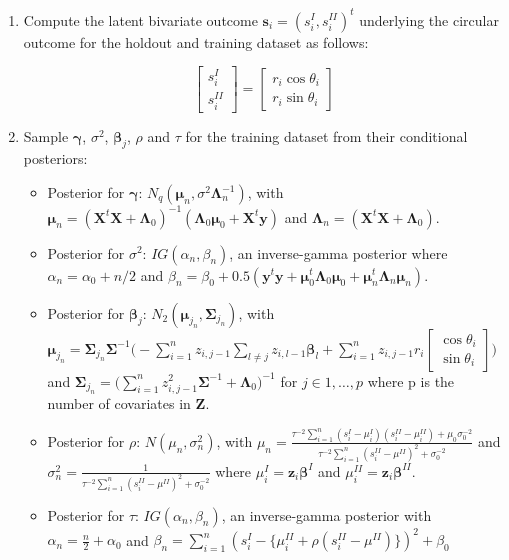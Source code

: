 \documentclass[11pt,]{article}
\begin{document}
\begin{appendices}
\begin{enumerate}
\item Compute the latent bivariate outcome $\boldsymbol{s}_i = (s_i^{I}, s_i^{II})^t$ underlying the circular outcome for the holdout and training dataset as follows:

$$\begin{bmatrix} s^{I}_{i} \\ s^{II}_{i} \end{bmatrix} = \begin{bmatrix} r_i \cos \theta_i \\  r_i\sin \theta_i\end{bmatrix}$$

\item Sample $\boldsymbol{\gamma}$, $\sigma^2$, $\boldsymbol{\beta}_j$, $\rho$ and $\tau$ for the training dataset from their conditional posteriors:

\begin{itemize}
\item Posterior for $\boldsymbol{\gamma}$: $N_q(\boldsymbol{\mu}_n, \sigma^2\boldsymbol{\Lambda}^{-1}_n)$, with $\boldsymbol{\mu}_n = (\boldsymbol{X}^t\boldsymbol{X} + \boldsymbol{\Lambda}_0)^{-1}(\boldsymbol{\Lambda}_0\boldsymbol{\mu}_0 + \boldsymbol{X}^t\boldsymbol{y})$ and $\boldsymbol{\Lambda}_n = (\boldsymbol{X}^t\boldsymbol{X} + \boldsymbol{\Lambda}_0)$.
\item Posterior for $\sigma^2$: $IG(\alpha_{n}, \beta_{n})$, an inverse-gamma posterior where $\alpha_{n} = \alpha_0 + n/2$ and $\beta_{n} = \beta_0 + 0.5(\boldsymbol{y}^t\boldsymbol{y} + \boldsymbol{\mu}_{0}^t\boldsymbol{\Lambda}_0\boldsymbol{\mu}_{0} + \boldsymbol{\mu}_{n}^t\boldsymbol{\Lambda}_n\boldsymbol{\mu}_{n})$.
\item Posterior for $\boldsymbol{\beta}_j$: $N_2(\boldsymbol{\mu}_{j_{n}}, \boldsymbol{\Sigma}_{j_{n}})$, with $\boldsymbol{\mu}_{j_{n}} = \boldsymbol{\Sigma}_{j_{n}}\boldsymbol{\Sigma}^{-1}\Bigg(-\sum_{i=1}^{n}z_{i,j-1}\sum_{l\neq j}z_{i,l-1}\boldsymbol{\beta}_l + \sum_{i=1}^{n}z_{i,j-1}r_i\begin{bmatrix} \cos \theta_i \\ \sin \theta_i\end{bmatrix}\Bigg)$ and  $\boldsymbol{\Sigma}_{j_{n}} = \Big(\sum_{i=1}^{n}z_{i,j-1}^2\boldsymbol{\Sigma}^{-1}+\boldsymbol{\Lambda}_0\Big)^{-1}$ for $j \in 1, \dots, p$ where p is the number of covariates in $\boldsymbol{Z}$.
\item Posterior for $\rho$: $N(\mu_n, \sigma^2_n)$, with $\mu_n = \frac{\tau^{-2} \sum_{i=1}^{n}(s^{I}_{i} - \mu_i^{I})(s^{II}_{i} - \mu_i^{II}) + \mu_0\sigma_0^{-2}}{\tau^{-2}\sum_{i=1}^{n}(s^{II}_{i} - \mu^{II})^2 + \sigma_0^{-2}}$ and $\sigma_n^2 = \frac{1}{\tau^{-2}\sum_{i=1}^{n}(s^{II}_{i} - \mu^{II})^2 + \sigma_0^{-2}}$ where $\mu_i^{I} = \boldsymbol{z}_i\boldsymbol{\beta}^{I}$ and $\mu_i^{II} = \boldsymbol{z}_i\boldsymbol{\beta}^{II}$.
\item Posterior for $\tau$: $IG(\alpha_n, \beta_n)$, an inverse-gamma posterior with $\alpha_n = \frac{n}{2} + \alpha_0$ and $\beta_n = \sum\limits_{i = 1}^{n}(s^{I}_{i} - \{\mu_i^{II} + \rho(s^{II}_{i} - \mu^{II})\})^2 + \beta_0$
\end{itemize}


\end{enumerate}
\end{appendices}
\end{document}
